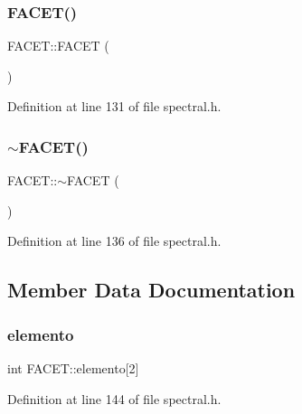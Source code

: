 \subsubsection{\texorpdfstring{F\+A\+C\+E\+T()}{FACET()}}
{\footnotesize\ttfamily F\+A\+C\+E\+T\+::\+F\+A\+C\+ET (\begin{DoxyParamCaption}{ }\end{DoxyParamCaption})\hspace{0.3cm}{\ttfamily [inline]}}



Definition at line 131 of file spectral.\+h.

\mbox{\label{structFACET_a2be80dc821fe7969405c8ab56e070bd4}} 
\subsubsection{\texorpdfstring{$\sim$\+F\+A\+C\+E\+T()}{~FACET()}}
{\footnotesize\ttfamily F\+A\+C\+E\+T\+::$\sim$\+F\+A\+C\+ET (\begin{DoxyParamCaption}{ }\end{DoxyParamCaption})\hspace{0.3cm}{\ttfamily [inline]}}



Definition at line 136 of file spectral.\+h.



\subsection{Member Data Documentation}
\mbox{\label{structFACET_ab32efdbdcb0aa54c0a17340b2ed6bca0}} 
\subsubsection{\texorpdfstring{elemento}{elemento}}
{\footnotesize\ttfamily int F\+A\+C\+E\+T\+::elemento\mbox{[}2\mbox{]}}



Definition at line 144 of file spectral.\+h.

\mbox{\label{structFACET_a13c20db8879ddf701f093ac36e0235f8}} 
